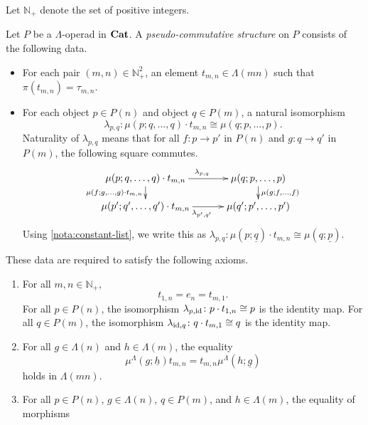 \begin{nota}
Let $\mathbb{N}_{+}$ denote the set of positive integers.
\end{nota}

\begin{Defi}\label{Defi:ps-comm_operad}
Let $P$ be a $\Lambda$-operad in $\mathbf{Cat}$. A \emph{pseudo-commutative structure} on $P$ consists of the following data.
    \begin{itemize}
        \item For each pair $(m,n) \in \mathbb{N}_{+}^2$, an element $t_{m,n} \in \Lambda(mn)$ such that  $\pi(t_{m,n}) = \tau_{m,n}$.     
        \item For each object $p \in P(n)$ and object $q \in P(m)$, a natural isomorphism
            \[
                \lambda_{p,q} \colon \mu(p;q,\ldots,q) \cdot t_{m,n} \cong \mu(q;p,\ldots,p).
            \]
            Naturality of $\lambda_{p,q}$ means that for all $f \colon p \to p'$ in $P(n)$ and $g \colon q \to q'$ in $P(m)$, the following square commutes.
             \[
    \xy
      (0,0)*+{\mu(p;q,\ldots,q) \cdot t_{m,n}} ="00";
      (0,-10)*+{\mu(p';q',\ldots,q') \cdot t_{m,n}} ="01";
      (40,0)*+{\mu(q;p,\ldots,p)} ="10";
      (40,-10)*+{\mu(q';p',\ldots,p')} ="11";
      {\ar^{\lambda_{p,q}} "00" ; "10"};
      {\ar^{\mu(g; f, \ldots, f)} "10" ; "11"};
      {\ar_{\mu(f; g, \ldots, g) \cdot t_{m,n}} "00" ; "01"};
      {\ar_{\lambda_{p',q'}} "01" ; "11"};
    \endxy
  \]
Using \cref{nota:constant-list}, we write this as $\lambda_{p,q}\colon \mu(p; \underline{q}) \cdot t_{m,n} \cong \mu(q; \underline{p})$.
    \end{itemize}
These data are required to satisfy the following axioms.  
    \begin{enumerate}
        \item\label{axiom:t_id} For all $m,n \in \mathbb{N}_+$,
            \[
                t_{1,n} = e_n = t_{m,1}.
            \]
             For all $p \in P(n)$, the isomorphism $\lambda_{p, \textrm{id}}\colon p \cdot t_{1,n} \cong p$ is the identity map.
             For all $q \in P(m)$, the isomorphism $\lambda_{\textrm{id}, q}\colon q \cdot t_{m,1} \cong q$ is the identity map.
             \item\label{axiom:t_nat} For all $g \in \Lambda(n)$ and $h \in \Lambda(m)$, the equality
        \[
        \mu^{\Lambda}(g; \underline{h}) t_{m,n} = t_{m,n} \mu^{\Lambda}(h; \underline{g})
        \]
        holds in $\Lambda(mn)$.
        \item\label{axiom:t_equiv} For all $p \in P(n)$, $g \in \Lambda(n)$, $q \in P(m)$, and $h \in \Lambda(m)$, the equality of morphisms

\end{enumerate}
\end{Defi}
